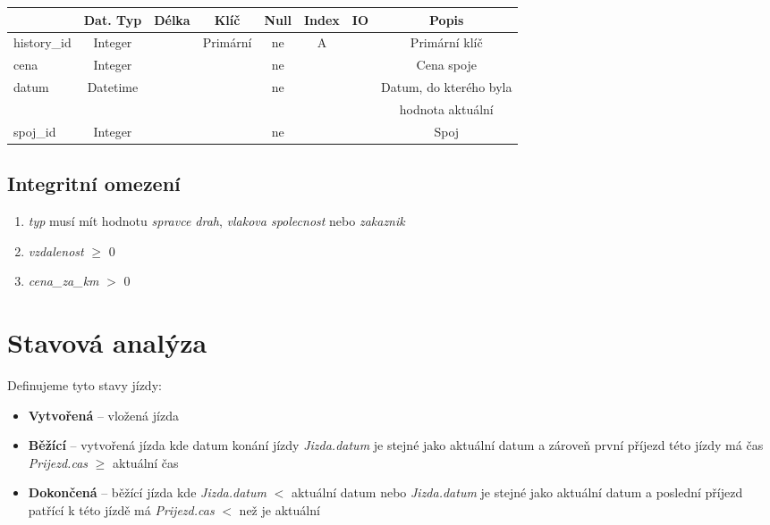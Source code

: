 \documentclass[11pt]{article}
\begin{document}
\begin{table}[H]
    \begin{tabular}{|l|c|c|c|c|c|c|c|} \hline
                    & Dat. Typ  & Délka & Klíč      & Null  & Index & IO    & Popis \\ \hline
        history\_id	& Integer	&	    & Primární	& ne	& A		&       & Primární klíč \\ \hline
        cena	    & Integer	&	    & 	        & ne	&		&       & Cena spoje \\ \hline
        datum	    & Datetime	&	    & 	        & ne	&		&       & Datum, do kterého byla\\ &&&&&&& hodnota aktuální \\ \hline
        spoj\_id	& Integer	&	    & 	        & ne	&		&       & Spoj \\ \hline
    \end{tabular}
\end{table}

\subsection{Integritní omezení}
\begin{enumerate}
    \item \textit{typ} musí mít hodnotu \textit{spravce drah}, \textit{vlakova spolecnost} nebo \textit{zakaznik}
    \item \textit{vzdalenost} $\geq$ 0
    \item \textit{cena\_za\_km} $>$ 0
\end{enumerate}

\section{Stavová analýza}
Definujeme tyto stavy jízdy:
\begin{itemize}
    \item \textbf{Vytvořená} – vložená jízda
    \item \textbf{Běžící} – vytvořená jízda kde datum konání jízdy \textit{Jizda.datum} je stejné jako aktuální datum a zároveň první příjezd této jízdy má čas \textit{Prijezd.cas} $\geq$ aktuální čas
    \item \textbf{Dokončená} – běžící jízda kde \textit{Jizda.datum} $<$ aktuální datum nebo \textit{Jizda.datum} je stejné jako aktuální datum a poslední příjezd patřící k této jízdě má \textit{Prijezd.cas} $<$ než je aktuální
\end{itemize}
\end{document}

